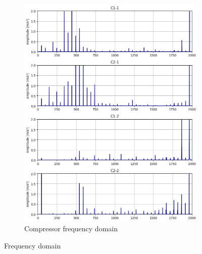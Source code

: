 \begin{figure}[h]
\begin{subfigure}[b]{0.33\textwidth}
        \includegraphics[width=\textwidth]{assets/results/eda/frequency-spectrum-compressors.png}
        \caption{Compressor frequency domain}
    \end{subfigure} 
    \caption{Frequency domain}
\end{figure}


